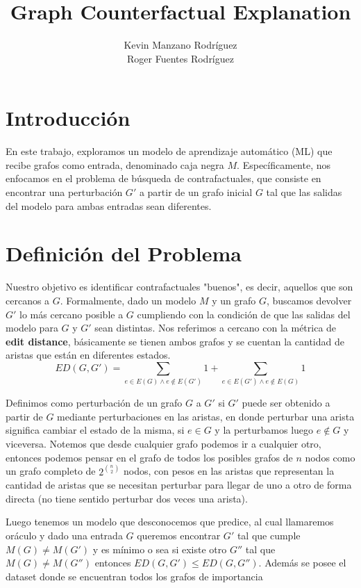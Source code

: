 \documentclass[a4paper]{article}
\title{Graph Counterfactual Explanation}
\author{Kevin Manzano Rodr\'iguez \\ Roger Fuentes Rodr\'iguez}
\date{}
\begin{document}
\maketitle

\section{Introducción}
En este trabajo, exploramos un modelo de aprendizaje automático (ML) que recibe grafos como entrada, denominado caja negra \(M\). Específicamente, nos enfocamos en el problema de búsqueda de contrafactuales, que consiste en encontrar una perturbación \(G'\) a partir de un grafo inicial \(G\) tal que las salidas del modelo para ambas entradas sean diferentes.

\section{Definición del Problema}

Nuestro objetivo es identificar contrafactuales "buenos", es decir, aquellos que son cercanos a \(G\). Formalmente, dado un modelo \(M\) y un grafo \(G\), buscamos devolver \(G'\) lo más cercano posible a \(G\) cumpliendo con la condición de que las salidas del modelo para \(G\) y \(G'\) sean distintas. Nos referimos a cercano con la m\'etrica de \textbf{edit distance}, b\'asicamente se tienen ambos grafos y se cuentan la cantidad de aristas que est\'an en diferentes estados.
 $$ED(G, G') = \sum_{e \in E(G) \wedge  e \notin E(G')}1  + \sum_{e \in E(G') \wedge  e \notin E(G)} 1$$

Definimos como perturbación de un grafo $G$ a $G'$ si $G'$ puede ser obtenido a partir de $G$ mediante perturbaciones en las aristas, en donde perturbar una arista significa cambiar el estado de la misma, si $e \in G$ y la perturbamos luego $e \notin G$ y viceversa. Notemos que desde cualquier grafo podemos ir a cualquier otro, entonces podemos pensar en el grafo de todos los posibles grafos de $n$ nodos como un grafo completo de $2 ^ {\binom{n}{2}}$ nodos, con pesos en las aristas que representan la cantidad de aristas que se necesitan perturbar para llegar de uno a otro de forma directa (no tiene sentido perturbar dos veces una arista).

Luego tenemos un modelo que desconocemos que predice, al cual llamaremos or\'aculo y dado una entrada $G$ queremos encontrar $G'$ tal que cumple $M(G) \neq  M(G')$ y es m\'inimo o sea si existe otro $G''$ tal que $M(G) \neq  M(G'')$ entonces $ED(G, G') \leq ED(G, G'')$. Adem\'as se posee el dataset donde se encuentran todos los grafos de importancia
\end{document}
